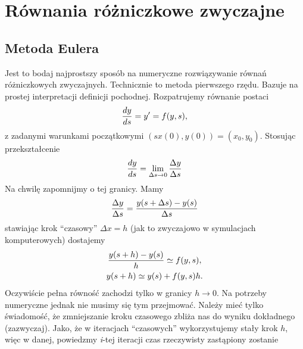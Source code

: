 \documentclass[a4paper,12pt,polish]{sphinxmanual}
\begin{document}
\section{Równania różniczkowe zwyczajne}
\label{ch5/chV012:python}\label{ch5/chV012::doc}\label{ch5/chV012:rownania-rozniczkowe-zwyczajne}

\subsection{Metoda Eulera}
\label{ch5/chV012:metoda-eulera}
Jest to bodaj najprostszy sposób na numeryczne rozwiązywanie równań różniczkowych
zwyczajnych. Technicznie to metoda pierwszego rzędu. Bazuje na prostej interpretacji
definicji pochodnej. Rozpatrujemy równanie postaci
\begin{gather}
\begin{split}\frac{dy}{ds} = y' = f(y,s),\end{split}\notag
\end{gather}
z zadanymi warunkami początkowymi $(sx(0), y(0)) = (x_0, y_0)$. Stosując przekształcenie
\begin{gather}
\begin{split}\frac{dy}{ds} = \lim_{\Delta s \to 0}\frac{\Delta y}{\Delta s}\end{split}\notag
\end{gather}
Na chwilę zapomnijmy o tej granicy. Mamy
\begin{gather}
\begin{split}\frac{\Delta y}{\Delta s} = \frac{y(s+\Delta s) - y(s)}{\Delta s}\end{split}\notag
\end{gather}
stawiając krok ``czasowy'' $\Delta x = h$ (jak to zwyczajowo w symulacjach komputerowych)
dostajemy
\begin{gather}
\begin{split}\frac{y(s + h) - y(s)}{h} \simeq f(y,s),\end{split}\notag\\\begin{split}y(s+h) \simeq y(s) + f(y,s) h.\end{split}\notag
\end{gather}
Oczywiście pełna równość zachodzi tylko w granicy $h \to 0$. Na potrzeby numeryczne jednak
nie musimy się tym przejmować. Należy mieć tylko świadomość, że zmniejszanie kroku czasowego
zbliża nas do wyniku dokładnego (zazwyczaj). Jako, że w iteracjach ``czasowych'' wykorzystujemy
stały krok $h$, więc w danej, powiedzmy \emph{i}-tej iteracji czas rzeczywisty zastąpiony zostanie
\end{document}
